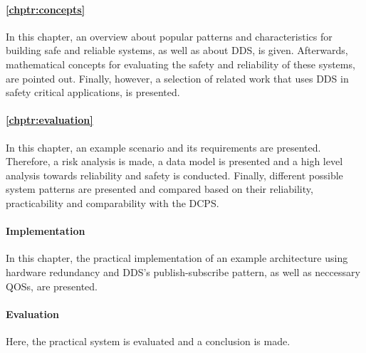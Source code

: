 \paragraph{\autoref{chptr:concepts}}
In this chapter, an overview about popular patterns and characteristics for building safe and reliable systems, as well as about \gls*{DDS}, is given.
Afterwards, mathematical concepts for evaluating the safety and reliability of these systems, are pointed out.
Finally, however, a selection of related work that uses \gls{DDS} in safety critical applications, is presented.

\paragraph{\autoref{chptr:evaluation}}
In this chapter, an example scenario and its requirements are presented.
Therefore, a risk analysis is made, a data model is presented and a high level analysis towards reliability and safety is conducted.
Finally, different possible system patterns are presented and compared based on their reliability, practicability and comparability with the \gls*{DCPS}.

\paragraph{Implementation}
In this chapter, the practical implementation of an example architecture using hardware redundancy and \gls*{DDS}'s publish-subscribe pattern, as well as neccessary \glspl*{QOS}, are presented.

\paragraph{Evaluation}
Here, the practical system is evaluated and a conclusion is made.
